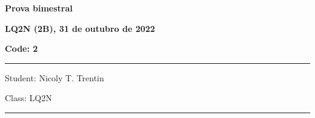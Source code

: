 \documentclass[12pt, addpoints]{exam}
\begin{document}
    \begin{minipage}[b]{0.75\linewidth}
        \begin{flushleft}
            {\bf \large Prova bimestral}
        \end{flushleft}
        \begin{flushleft}
            {\bf \large LQ2N (2B), 31 de outubro de 2022}
        \end{flushleft}
    \end{minipage}
    \begin{minipage}[b]{0.20\linewidth}
        \begin{flushright}
            {\bf \large Code: 2}
        \end{flushright}
    \end{minipage}
    \vspace{0.5cm} \hrule \vspace{0.5cm}
    \begin{minipage}{0.75\linewidth}
        \begin{flushleft}
            Student: Nicoly T. Trentin
        \end{flushleft}
    \end{minipage}
    \begin{minipage}{0.20\linewidth}
        \begin{flushright}
            Class: LQ2N
        \end{flushright}
    \end{minipage}
    \vspace{0.5cm} \hrule \vspace{0.5cm}
\end{document}
